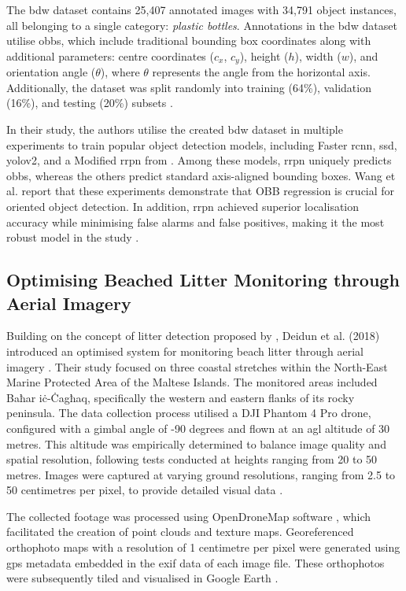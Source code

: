 The \gls{bdw} dataset contains 25,407 annotated images with 34,791 object instances, all belonging to a single category: \textit{plastic bottles}. Annotations in the \gls{bdw} dataset utilise \gls{obbs}, which include traditional bounding box coordinates along with additional parameters: centre coordinates ($c_x$, $c_y$), height ($h$), width ($w$), and orientation angle ($\theta$), where $\theta$ represents the angle from the horizontal axis. Additionally, the dataset was split randomly into training (64\%), validation (16\%), and testing (20\%) subsets \cite{bdwdataset}.

In their study, the authors utilise the created \gls{bdw} dataset in multiple experiments to train popular object detection models, including Faster \gls{rcnn}, \gls{ssd}, \gls{yolo}v2, and a Modified \gls{rrpn} from \cite{rrpn}. Among these models,  \gls{rrpn} uniquely predicts \gls{obbs}, whereas the others predict standard axis-aligned bounding boxes. Wang et al. report that these experiments demonstrate that OBB regression is crucial for oriented object detection. In addition,  \gls{rrpn} achieved superior localisation accuracy while minimising false alarms and false positives, making it the most robust model in the study \cite{bdwdataset}.

\subsection{Optimising Beached Litter Monitoring through Aerial Imagery}%
\label{subsec:3_geosurvey}

Building on the concept of litter detection proposed by \cite{bdwdataset}, Deidun et al. (2018) introduced an optimised system for monitoring beach litter through aerial imagery \cite{umgeosurvey}. Their study focused on three coastal stretches within the North-East Marine Protected Area of the Maltese Islands. The monitored areas included Baħar iċ-Ċagħaq, specifically the western and eastern flanks of its rocky peninsula. 
The data collection process utilised a DJI Phantom 4 Pro drone, configured with a gimbal angle of -90 degrees and flown at an \gls{agl} altitude of 30 metres. This altitude was empirically determined to balance image quality and spatial resolution, following tests conducted at heights ranging from 20 to 50 metres. Images were captured at varying ground resolutions, ranging from 2.5 to 50 centimetres per pixel, to provide detailed visual data \cite{umgeosurvey}.

The collected footage was processed using OpenDroneMap software \cite{OpenDroneMap}, which facilitated the creation of point clouds and texture maps. Georeferenced orthophoto maps with a resolution of 1 centimetre per pixel were generated using \gls{gps} metadata embedded in the \gls{exif} data of each image file. These orthophotos were subsequently tiled and visualised in Google Earth \cite{umgeosurvey}.%

